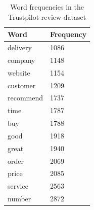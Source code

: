\clearpage

\begin{table}
\begin{center}
    \begin{tabular}{ | p{} | p{} |}
    \hline
    \textbf{Word} & \textbf{Frequency} \\ \hline
      delivery & 1086\\ \hline
	company & 1148\\ \hline
	website & 1154\\ \hline
	customer & 1209\\ \hline
	recommend & 1737\\ \hline
	time & 1787\\ \hline
	buy & 1788\\ \hline
	good & 1918\\ \hline
	great & 1940\\ \hline
	order & 2069\\ \hline
	price & 2085\\ \hline
	service & 2563\\ \hline
	number & 2872 \\ \hline
    \end{tabular}
\caption{Word frequencies in the Trustpilot review dataset}
\label{tab:wordfreq}
\end{center}
\end{table}

